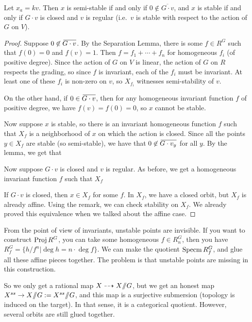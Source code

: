 \begin{proposition}
 Let $x_a=kv$. Then $x$ is semi-stable if and only if $0\not\in \overline{G\cdot v}$, and $x$ is stable if and only if $G\cdot v$ is closed and $v$ is regular (i.e.~$v$ is stable with respect to the action of $G$ on $V$).
\end{proposition}
\begin{proof}
 Suppose $0\not\in \bbar{G\cdot v}$. By the Separation Lemma, there is some $f\in R^G$ such that $f(0)=0$ and $f(v)=1$. Then $f=f_1+\cdots +f_n$ for homogeneous $f_i$ (of positive degree). Since the action of $G$ on $V$ is linear, the action of $G$ on $R$ respects the grading, so since $f$ is invariant, each of the $f_i$ must be invariant. At least one of these $f_i$ is non-zero on $v$, so $X_{f_i}$ witnesses semi-stability of $v$.
 
 On the other hand, if $0\in \bbar{G\cdot v}$, then for any homogeneous invariant function $f$ of positive degree, we have $f(v)=f(0)=0$, so $x$ cannot be stable.
 
 Now suppose $x$ is stable, so there is an invariant homogeneous function $f$ such that $X_f$ is a neighborhood of $x$ on which the action is closed. Since all the points $y\in X_f$ are stable (so semi-stable), we have that $0\not\in \bbar{G\cdot v_y}$ for all $y$. By the lemma, we get that  
 
 Now suppose $G\cdot v$ is closed and $v$ is regular. As before, we get a homogeneous invariant function $f$ such that $X_f$ 
 
 If $G\cdot v$ is closed, then $x\in X_f$ for some $f$. In $X_f$, we have a closed orbit, but $X_f$ is already affine. Using the remark, we can check stability on $X_f$. We already proved this equivalence when we talked about the affine case. 
\end{proof}
From the point of view of invariants, unstable points are invisible. If you want to construct $\operatorname{Proj} R^G$, you can take some homogeneous $f\in R^G_n$, then you have $R^G_f=\{h/f^n|\deg h=n\cdot \deg f\}$. We can make the quotient $\operatorname{Specm} R^G_f$, and glue all these affine pieces together. The problem is that unstable points are missing in this construction.

So we only get a rational map $X\dashrightarrow X\mbox{\rm /\!\!/} G$, but we get an honest map $X^{ss}\to X\mbox{\rm /\!\!/} G:=X^{ss}\mbox{\rm /\!\!/} G$, and this map is a surjective submersion (topology is induced on the target). In that sense, it is a categorical quotient. However, several orbits are still glued together.

